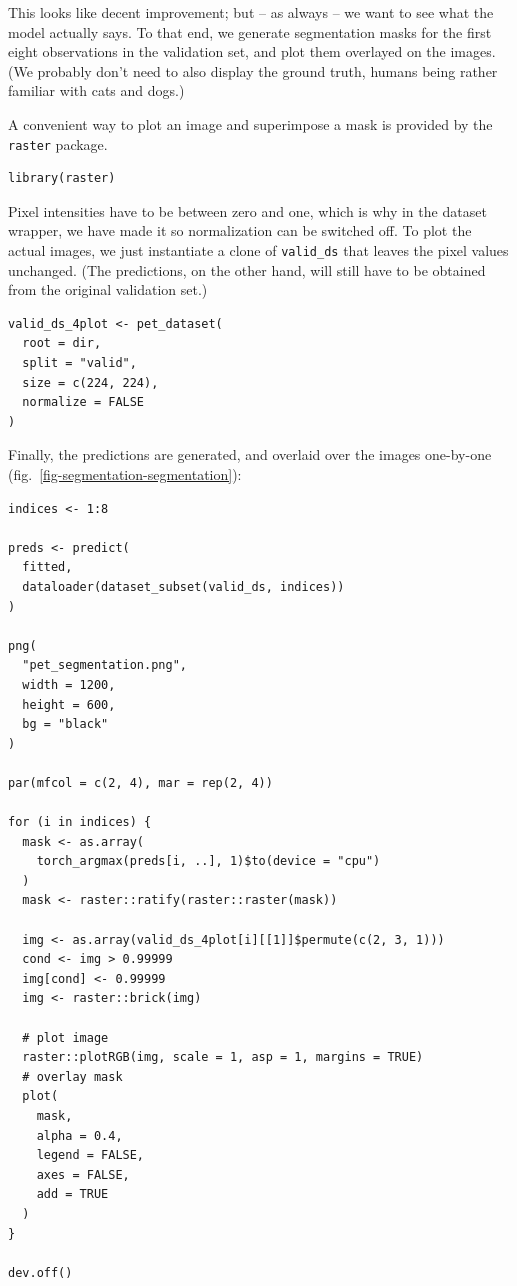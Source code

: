\documentclass[
  letterpaper,
]{krantz}
\begin{document}
This looks like decent improvement; but -- as always -- we want to see
what the model actually says. To that end, we generate segmentation
masks for the first eight observations in the validation set, and plot
them overlayed on the images. (We probably don't need to also display
the ground truth, humans being rather familiar with cats and dogs.)

A convenient way to plot an image and superimpose a mask is provided by
the \texttt{raster} package.

\begin{verbatim}
library(raster)
\end{verbatim}

Pixel intensities have to be between zero and one, which is why in the
dataset wrapper, we have made it so normalization can be switched off.
To plot the actual images, we just instantiate a clone of
\texttt{valid\_ds} that leaves the pixel values unchanged. (The
predictions, on the other hand, will still have to be obtained from the
original validation set.)

\begin{verbatim}
valid_ds_4plot <- pet_dataset(
  root = dir,
  split = "valid",
  size = c(224, 224),
  normalize = FALSE
)
\end{verbatim}

Finally, the predictions are generated, and overlaid over the images
one-by-one (fig.~\ref{fig-segmentation-segmentation}):

\begin{verbatim}
indices <- 1:8

preds <- predict(
  fitted,
  dataloader(dataset_subset(valid_ds, indices))
)

png(
  "pet_segmentation.png",
  width = 1200,
  height = 600,
  bg = "black"
)

par(mfcol = c(2, 4), mar = rep(2, 4))

for (i in indices) {
  mask <- as.array(
    torch_argmax(preds[i, ..], 1)$to(device = "cpu")
  )
  mask <- raster::ratify(raster::raster(mask))

  img <- as.array(valid_ds_4plot[i][[1]]$permute(c(2, 3, 1)))
  cond <- img > 0.99999
  img[cond] <- 0.99999
  img <- raster::brick(img)

  # plot image
  raster::plotRGB(img, scale = 1, asp = 1, margins = TRUE)
  # overlay mask
  plot(
    mask,
    alpha = 0.4,
    legend = FALSE,
    axes = FALSE,
    add = TRUE
  )
}

dev.off()
\end{verbatim}
\end{document}
